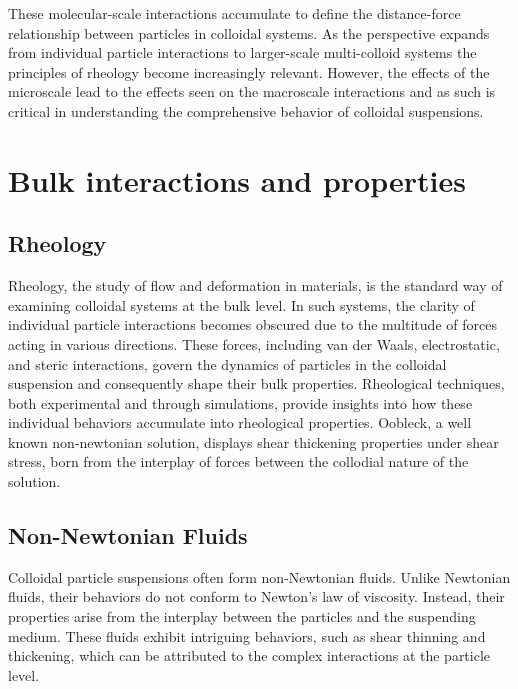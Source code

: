 These molecular-scale interactions accumulate to define the distance-force relationship between particles in colloidal systems. As the perspective expands from individual particle interactions to larger-scale multi-colloid systems the principles of rheology become increasingly relevant. However, the effects of the microscale lead to the effects seen on the macroscale interactions and as such is critical in understanding the comprehensive behavior of colloidal suspensions. 

\cite{StericForcesReference, PolymerBrushesStudy}



\section{Bulk interactions and properties}

\subsection{Rheology}
Rheology, the study of flow and deformation in materials, is the standard way of examining colloidal systems at the bulk level. In such systems, the clarity of individual particle interactions becomes obscured due to the multitude of forces acting in various directions. These forces, including van der Waals, electrostatic, and steric interactions, govern the dynamics of particles in the colloidal suspension and consequently shape their bulk properties. Rheological techniques, both experimental and through simulations, provide insights into how these individual behaviors accumulate into rheological properties. Oobleck, a well known non-newtonian solution, displays shear thickening properties under shear stress, born from the interplay of forces between the collodial nature of the solution.

\subsection{Non-Newtonian Fluids}
Colloidal particle suspensions often form non-Newtonian fluids. Unlike Newtonian fluids, their behaviors do not conform to Newton's law of viscosity. Instead, their properties arise from the interplay between the particles and the suspending medium. These fluids exhibit intriguing behaviors, such as shear thinning and thickening, which can be attributed to the complex interactions at the particle level.\cite{Rheo2}

